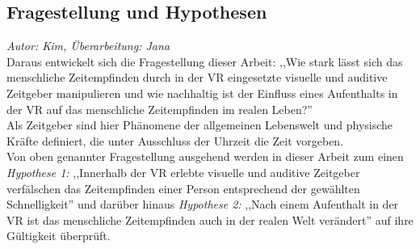 \documentclass{Paper}
\begin{document}
\subsection{Fragestellung und Hypothesen}
\textit{Autor: Kim, Überarbeitung: Jana}\\
Daraus entwickelt sich die Fragestellung dieser Arbeit: ,,Wie stark lässt sich das menschliche Zeitempfinden durch in der VR eingesetzte visuelle und auditive Zeitgeber manipulieren und wie nachhaltig ist der Einfluss eines Aufenthalts in der VR auf das menschliche Zeitempfinden im realen Leben?''\\
Als Zeitgeber sind hier Phänomene der allgemeinen Lebenswelt und physische Kräfte definiert, die unter Ausschluss der Uhrzeit die Zeit vorgeben.\\
Von oben genannter Fragestellung ausgehend werden in dieser Arbeit zum einen \textit{Hypothese 1:} ,,Innerhalb der VR erlebte visuelle und auditive Zeitgeber verfälschen das Zeitempfinden einer Person entsprechend der gewählten Schnelligkeit'' und darüber hinaus \textit{Hypothese 2:} ,,Nach einem Aufenthalt in der VR ist das menschliche Zeitempfinden auch in der realen Welt verändert'' auf ihre Gültigkeit überprüft.
 
\end{document}

